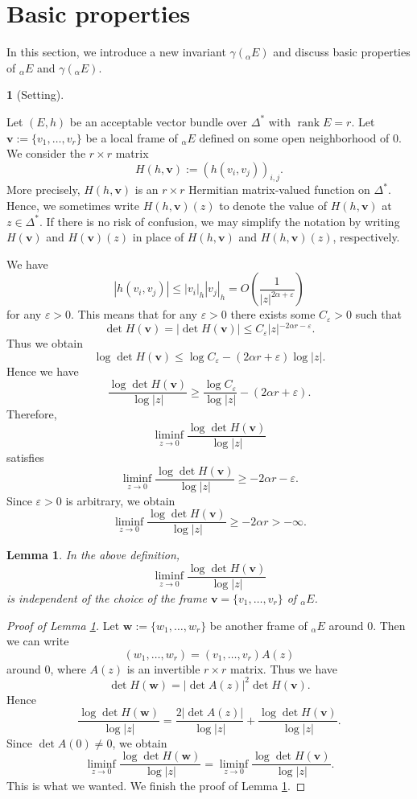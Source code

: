 \documentclass[12pt,twoside]{amsart}
\DeclareMathOperator{\rank}{rank}
\newtheorem{lem}[thm]{Lemma}
\theoremstyle{definition}
\newtheorem{say}[thm]{}
\begin{document}
\section{Basic properties}\label{p-sec7}

In this section, we introduce a new invariant $\gamma ({}_\alpha E)$ and 
discuss basic properties of ${}_\alpha E$ and $\gamma ({}_\alpha E)$. 

\begin{say}[Setting]\label{p-say7.1}

Let $(E, h)$ be an acceptable vector bundle over $\Delta^*$ with 
$\rank E = r$. 
Let $\bm{v} := \{v_1, \ldots, v_r\}$ be a local 
frame of ${}_\alpha E$ defined on some open 
neighborhood of $0$. We consider the $r \times r$ matrix 
\[
H(h, \bm{v}) := \left(h(v_i, v_j)\right)_{i,j}.
\] 
More precisely, $H(h, \bm{v})$ is 
an $r \times r$ Hermitian matrix-valued 
function on $\Delta^*$. Hence, we sometimes 
write $H(h, \bm{v})(z)$ to denote the value of $H(h, \bm{v})$ at $z \in \Delta^*$. 
If there is no risk of confusion, we may simplify the 
notation by writing $H(\bm{v})$ and $H(\bm{v})(z)$ 
in place of $H(h, \bm{v})$ and $H(h, \bm{v})(z)$, respectively.

We have 
\[
|h(v_i, v_j)|\leq |v_i|_h|v_j|_h=O\left(\frac{1}{|z|^{2\alpha +\varepsilon}}\right)
\] 
for any $\varepsilon >0$. 
This means that for any $\varepsilon >0$ there exists some $C_\varepsilon>0$ 
such that 
\[
\det H(\bm v)=|\det H(\bm v)|\leq C_{\varepsilon} 
{|z|{^{-2\alpha r-\varepsilon}}}. 
\]
Thus we obtain 
\[
\log \det H(\bm v)\leq \log C_{\varepsilon} 
-(2\alpha r+\varepsilon)\log |z|. 
\] 
Hence we have 
\[
\frac{\log \det H(\bm v)}{\log |z|} \geq 
\frac{\log C_\varepsilon}{\log |z|} -
(2\alpha r+\varepsilon). 
\]
Therefore, 
\[ 
\liminf_{z\to 0} \frac{\log\det H(\bm v)}{\log |z|}
\] 
satisfies  
\[
\liminf_{z\to 0} \frac{\log\det H(\bm v)}{\log |z|}\geq -2\alpha r-\varepsilon. 
\] 
Since $\varepsilon >0$ is arbitrary, we obtain 
\begin{equation}\label{p-eq7.1}
\liminf_{z\to 0} \frac{\log\det H(\bm v)}{\log |z|}\geq -2\alpha r>-\infty. 
\end{equation}
\end{say}

\begin{lem}\label{p-lem7.2}
In the above definition, 
\[
\liminf_{z\to 0} \frac{\log\det H(\bm v)}{\log |z|}
\] 
is independent of the choice of the frame $\bm v=\{v_1, \ldots, v_r\}$ 
of ${}_\alpha E$. 
\end{lem} 
\begin{proof}[Proof of Lemma \ref{p-lem7.2}]
Let $\bm w:=\{w_1, \ldots, w_r\}$ be another frame of ${}_\alpha E$ around 
$0$. Then we can write 
\[
(w_1, \ldots, w_r)=(v_1, \ldots, v_r)A(z)
\] 
around $0$, where $A(z)$ is an invertible $r\times r$ matrix. 
Thus we have 
\[
\det H(\bm w)=|\det A(z)|^2 \det H(\bm v). 
\] 
Hence 
\[
\frac{\log \det H(\bm w)}{\log |z|} 
=\frac{2|\det A(z)|}{\log |z|} +
\frac{\log \det H(\bm v)}{\log |z|}. 
\] 
Since $\det A(0)\ne 0$, we obtain 
\[
\liminf_{z\to 0} \frac{\log\det H(\bm w)}{\log |z|}=
\liminf_{z\to 0} \frac{\log\det H(\bm v)}{\log |z|}. 
\] 
This is what we wanted. We finish the proof of Lemma \ref{p-lem7.2}. 
\end{proof}
\end{document}
